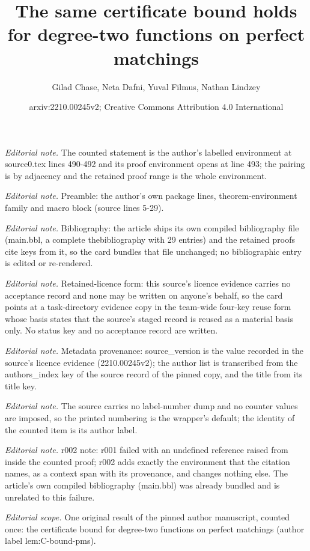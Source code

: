 \documentclass[10pt,a4paper]{article}
\title{The same certificate bound holds for degree-two functions on perfect matchings}
\author{Gilad Chase, Neta Dafni, Yuval Filmus, Nathan Lindzey}
\date{arxiv:2210.00245v2; Creative Commons Attribution 4.0 International}
\theoremstyle{definition}
\begin{document}
\maketitle
\noindent\textit{Editorial note.} The counted statement is the author's labelled environment at source0.tex lines 490-492 and its proof environment opens at line 493; the pairing is by adjacency and the retained proof range is the whole environment.\par\medskip
\noindent\textit{Editorial note.} Preamble: the author's own package lines, theorem-environment family and macro block (source lines 5-29).\par\medskip
\noindent\textit{Editorial note.} Bibliography: the article ships its own compiled bibliography file (main.bbl, a complete thebibliography with 29 entries) and the retained proofs cite keys from it, so the card bundles that file unchanged; no bibliographic entry is edited or re-rendered.\par\medskip
\noindent\textit{Editorial note.} Retained-licence form: this source's licence evidence carries no acceptance record and none may be written on anyone's behalf, so the card points at a task-directory evidence copy in the team-wide four-key reuse form whose basis states that the source's staged record is reused as a material basis only. No status key and no acceptance record are written.\par\medskip
\noindent\textit{Editorial note.} Metadata provenance: source\_version is the value recorded in the source's licence evidence (2210.00245v2); the author list is transcribed from the authors\_index key of the source record of the pinned copy, and the title from its title key.\par\medskip
\noindent\textit{Editorial note.} The source carries no label-number dump and no counter values are imposed, so the printed numbering is the wrapper's default; the identity of the counted item is its author label.\par\medskip
\noindent\textit{Editorial note.} r002 note: r001 failed with an undefined reference raised from inside the counted proof; r002 adds exactly the environment that the citation names, as a context span with its provenance, and changes nothing else. The article's own compiled bibliography (main.bbl) was already bundled and is unrelated to this failure.\par\medskip
\noindent\textit{Editorial scope.} One original result of the pinned author manuscript, counted once: the certificate bound for degree-two functions on perfect matchings (author label lem:C-bound-pms).\par\medskip
\end{document}
